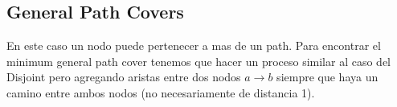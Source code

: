 \documentclass{article}
\begin{document}
\subsection{General Path Covers}
En este caso un nodo puede pertenecer a mas de un path. Para encontrar el minimum general path cover tenemos que hacer un proceso similar al caso del Disjoint pero agregando aristas entre dos nodos $a \rightarrow b$ siempre que haya un camino entre ambos nodos (no necesariamente de distancia 1).
\end{document}
